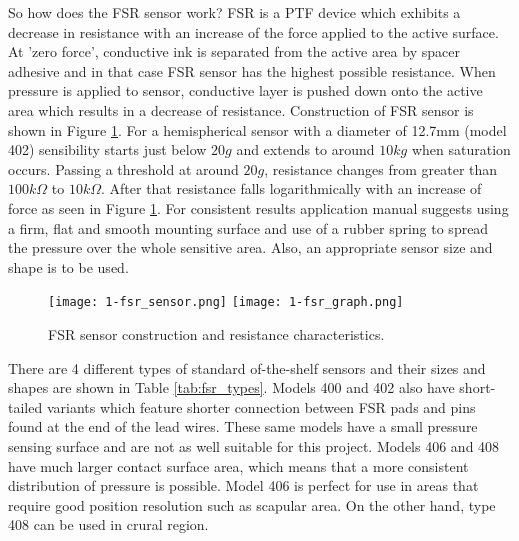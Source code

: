 So how does the \ac{FSR} sensor work? \ac{FSR} is a \ac{PTF} device which exhibits a decrease in resistance with an increase of the force applied to the active surface\cite{fsr_guide}. At 'zero force', conductive ink is separated from the active area by spacer adhesive and in that case \ac{FSR} sensor has the highest possible resistance. When pressure is applied to sensor, conductive layer is pushed down onto the active area which results in a decrease of resistance. Construction of FSR sensor is shown in Figure \ref{fig:fsr-sensor}. For a hemispherical sensor with a diameter of 12.7mm (model 402) sensibility starts just below $20 g$ and extends to around $10 kg$ when saturation occurs. Passing a threshold at around $20 g$, resistance changes from greater than $100 k\Omega$ to $10 k\Omega$. After that resistance falls logarithmically with an increase of force as seen in Figure \ref{fig:fsr-sensor}. For consistent results application manual\cite{fsr_guide} suggests using a firm, flat and smooth mounting surface and use of a rubber spring to spread the pressure over the whole sensitive area. Also, an appropriate sensor size and shape is to be used.

\begin{figure}[h]
  \begin{center}
    \texttt{[image: 1-fsr\_sensor.png]}
    \texttt{[image: 1-fsr\_graph.png]}
  \end{center}
  \caption{FSR sensor construction and resistance characteristics.}
  \label{fig:fsr-sensor}
\end{figure}

There are 4 different types of standard of-the-shelf sensors\cite{fsr_guide} and their sizes and shapes are shown in Table \ref{tab:fsr_types}. Models 400 and 402 also have short-tailed variants which feature shorter connection between \ac{FSR} pads and pins found at the end of the lead wires. These same models have a small pressure sensing surface and are not as well suitable for this project. Models 406 and 408 have much larger contact surface area, which means that a more consistent distribution of pressure is possible. Model 406 is perfect for use in areas that require good position resolution such as scapular area. On the other hand, type 408 can be used in crural region.

